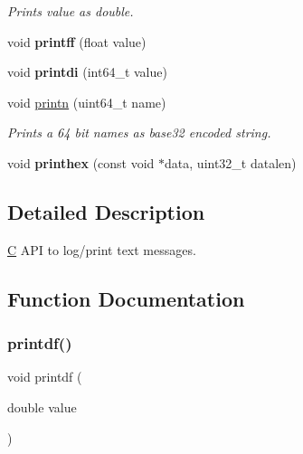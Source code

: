 \begin{DoxyCompactItemize}
\begin{DoxyCompactList}\small\item\em Prints value as double. \end{DoxyCompactList}\item 
\mbox{\label{group__consolecapi_ga1e3999c8ae72ad1920c25583b59d4a78}} 
void {\bfseries printff} (float value)
\item 
\mbox{\label{group__consolecapi_ga077086d260a56e7ac05dd03342698765}} 
void {\bfseries printdi} (int64\+\_\+t value)
\item 
void \mbox{\hyperlink{group__consolecapi_ga9ec6a2d163a27b98984065d55fb41475}{printn}} (uint64\+\_\+t name)
\begin{DoxyCompactList}\small\item\em Prints a 64 bit names as base32 encoded string. \end{DoxyCompactList}\item 
\mbox{\label{group__consolecapi_ga578a703ccc378e8e24f62016b06cbc27}} 
void {\bfseries printhex} (const void $\ast$data, uint32\+\_\+t datalen)
\end{DoxyCompactItemize}


\subsection{Detailed Description}
\mbox{\hyperlink{struct_c}{C}} A\+PI to log/print text messages. 



\subsection{Function Documentation}
\mbox{\label{group__consolecapi_gaea777842a3946bf2936e0d2d0ba95df2}} 
\subsubsection{\texorpdfstring{printdf()}{printdf()}}
{\footnotesize\ttfamily void printdf (\begin{DoxyParamCaption}\item[{double}]{value }\end{DoxyParamCaption})}



